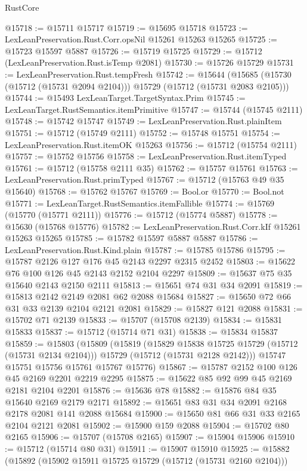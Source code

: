 \begin{lexlean}{RustCore}
\begin{coremodule}
@15718 := @15711 @15717
@15719 := @15695 @15718
@15723 := LexLeanPreservation.Rust.Corr.opsNil @15261 @15263 @15265
@15725 := @15723 @15597 @5887
@15726 := @15719 @15725
@15729 := @15712 (LexLeanPreservation.Rust.isTemp @2081)
@15730 := @15726 @15729
@15731 := LexLeanPreservation.Rust.tempFresh
@15742 := @15644
    (@15685 (@15730 (@15712 (@15731 @2094 @2104))) @15729 (@15712 (@15731 @2083 @2105)))
@15744 := @15493 LexLeanTarget.TargetSyntax.Prim
@15745 := LexLeanTarget.RustSemantics.itemPrimitive
@15747 := @15744 (@15745 @2111)
@15748 := @15742 @15747
@15749 := LexLeanPreservation.Rust.plainItem
@15751 := @15712 (@15749 @2111)
@15752 := @15748 @15751
@15754 := LexLeanPreservation.Rust.itemOK @15263
@15756 := @15712 (@15754 @2111)
@15757 := @15752 @15756
@15758 := LexLeanPreservation.Rust.itemTyped
@15761 := @15712 (@15758 @2111 @35)
@15762 := @15757 @15761
@15763 := LexLeanPreservation.Rust.primTyped
@15767 := @15712 (@15763 @49 @35 @15640)
@15768 := @15762 @15767
@15769 := Bool.or
@15770 := Bool.not
@15771 := LexLeanTarget.RustSemantics.itemFallible
@15774 := @15769 (@15770 (@15771 @2111))
@15776 := @15712 (@15774 @5887)
@15778 := @15630 (@15768 @15776)
@15782 := LexLeanPreservation.Rust.Corr.kIf @15261 @15263 @15265
@15785 := @15782 @15597 @5887 @5887
@15786 := LexLeanPreservation.Rust.Kind.plain
@15787 := @15785 @15786
@15795 := @15787 @2126 @127 @176 @45 @2143 @2297 @2315 @2452
@15803 := @15622 @76 @100 @126 @45 @2143 @2152 @2104 @2297
@15809 := @15637 @75 @35 @15640 @2143 @2150 @2111
@15813 := @15651 @74 @31 @34 @2091
@15819 := @15813 @2142 @2149 @2081 @62 @2088 @15684
@15827 := @15650 @72 @66 @31 @33 @2139 @2104 @2121 @2081
@15829 := @15827 @121 @2088
@15831 := @15702 @71 @2139
@15833 := @15707 (@15708 @2139)
@15834 := @15831 @15833
@15837 := @15712 (@15714 @71 @31)
@15838 := @15834 @15837
@15859 := @15803
    (@15809
      (@15819
        (@15829 @15838 @15725 @15729 (@15712 (@15731 @2134 @2104)))
        @15729
        (@15712 (@15731 @2128 @2142)))
      @15747
      @15751
      @15756
      @15761
      @15767
      @15776)
@15867 := @15787 @2152 @100 @126 @45 @2169 @2201 @2219 @2295
@15875 := @15622 @85 @92 @99 @45 @2169 @2181 @2104 @2201
@15876 := @15636 @78
@15882 := @15876 @84 @35 @15640 @2169 @2179 @2171
@15892 := @15651 @83 @31 @34 @2091 @2168 @2178 @2081 @141 @2088 @15684
@15900 := @15650 @81 @66 @31 @33 @2165 @2104 @2121 @2081
@15902 := @15900 @159 @2088
@15904 := @15702 @80 @2165
@15906 := @15707 (@15708 @2165)
@15907 := @15904 @15906
@15910 := @15712 (@15714 @80 @31)
@15911 := @15907 @15910
@15925 := @15882
    (@15892
      (@15902 @15911 @15725 @15729 (@15712 (@15731 @2160 @2104)))

\end{coremodule}
\end{lexlean}
